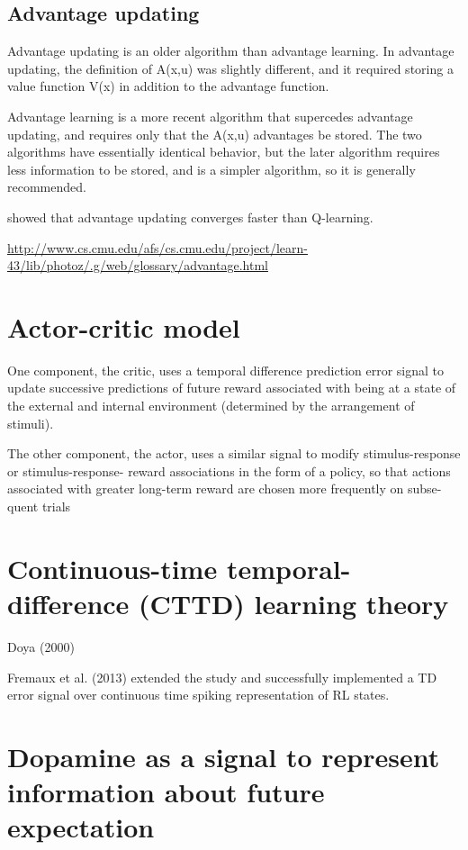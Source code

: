 \subsection{Advantage updating}
\label{sec:RL-advantage-updating}

Advantage updating is an older algorithm than advantage learning. In advantage
updating, the definition of A(x,u) was slightly different, and it required
storing a value function V(x) in addition to the advantage function. 

Advantage learning is a more recent algorithm that supercedes advantage
updating, and requires only that the A(x,u) advantages be stored. The two
algorithms have essentially identical behavior, but the later algorithm requires
less information to be stored, and is a simpler algorithm, so it is generally
recommended.

\citep{Harmon1993} showed that advantage updating converges faster than
Q-learning.

\url{http://www.cs.cmu.edu/afs/cs.cmu.edu/project/learn-43/lib/photoz/.g/web/glossary/advantage.html}

\section{Actor-critic model}
\label{sec:RL_actor-critic-model}

One  component,  the  critic,  uses  a  temporal difference  prediction  error
signal  to  update successive predictions of future reward associated with being
at a state of the external and internal  environment  (determined  by  the
 arrangement of stimuli).
 
The other component, the  actor,  uses  a  similar  signal  to  modify
stimulus-response   or   stimulus-response- reward associations in the form of a
policy, so that actions associated with greater long-term reward are chosen more
frequently on subse- quent trials

\section{Continuous-time temporal-difference (CTTD) learning theory}
\label{sec:RL-continuous-time-temporal-difference}

Doya (2000)

Fremaux et al. (2013) extended the study and successfully implemented 
a TD error signal over continuous time spiking representation of RL states.

\section{Dopamine as a signal to represent information about future expectation}
\label{sec:dopamine-in-reward-signaling}

